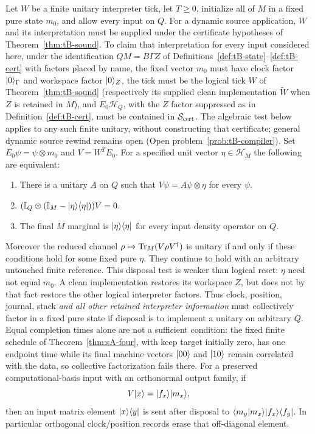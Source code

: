 \begin{theorem}\label{thm:tB-clean}
Let $W$ be a finite unitary interpreter tick, let $T\geq0$, initialize
all of $M$ in a fixed pure state $m_0$, and allow every input on $Q$.
For a dynamic source application, $W$ and its interpretation must be
supplied under the certificate hypotheses of Theorem~\ref{thm:tB-sound}.
To claim that interpretation for every input considered here, under
the identification $QM=B\Gamma Z$ of
Definitions~\ref{def:tB-state}--\ref{def:tB-cert} with factors placed
by name, the fixed vector $m_0$ must have clock factor
$\lvert 0\rangle_\Gamma$ and workspace factor $\lvert 0\rangle_Z$, the tick must be the
logical tick $W$ of Theorem~\ref{thm:tB-sound} (respectively its
supplied clean implementation $\widetilde W$ when $Z$ is retained
in $M$), and $E_0\mathcal H_Q$, with the $Z$ factor suppressed as
in Definition~\ref{def:tB-cert}, must be contained in
$\mathcal S_{\rm cert}$.
The algebraic test below applies to any such finite unitary, without
constructing that certificate; general dynamic source rewind remains
open (Open problem~\ref{prob:tB-compiler}).
Set $E_0\psi=\psi\otimes m_0$ and $V=W^TE_0$.
For a specified unit vector $\eta\in\mathcal H_M$ the following are
equivalent:
\begin{enumerate}
\item There is a unitary $A$ on $Q$ such that $V\psi=A\psi\otimes\eta$
for every $\psi$.
\item $(\mathbb{I}_Q\otimes(\mathbb{I}_M-\lvert \eta\rangle\langle \eta\rvert))V=0$.
\item The final $M$ marginal is $\lvert \eta\rangle\langle \eta\rvert$ for every input density
operator on $Q$.
\end{enumerate}
Moreover the reduced channel $\rho\mapsto\operatorname{Tr}_M(V\rho V^\dagger)$ is
unitary if and only if these conditions hold for some fixed pure $\eta$.
They continue to hold with an arbitrary untouched finite reference.
This disposal test is weaker than logical reset: $\eta$ need not equal
$m_0$. A clean implementation restores its workspace $Z$, but does not
by that fact restore the other logical interpreter factors.
Thus clock, position, journal, stack \emph{and all other retained
interpreter information} must collectively factor in a fixed pure state
if disposal is to implement a unitary on arbitrary $Q$.
Equal completion times alone are not a sufficient condition: the fixed
finite schedule of Theorem~\ref{thm:sA-four}, with keep target initially
zero, has one endpoint time while its final machine vectors
$\lvert 00\rangle$ and $\lvert 10\rangle$ remain correlated with the data, so collective
factorization fails there.
For a preserved computational-basis input with an orthonormal output
family, if
\[
 V\lvert x\rangle=\lvert f_x\rangle\lvert m_x\rangle,
\]
then an input matrix element $\lvert x\rangle\langle y\rvert$ is sent after disposal to
$\langle m_y|m_x\rangle\lvert f_x\rangle\langle f_y\rvert$. In particular orthogonal
clock/position records erase that off-diagonal element.
\end{theorem}
